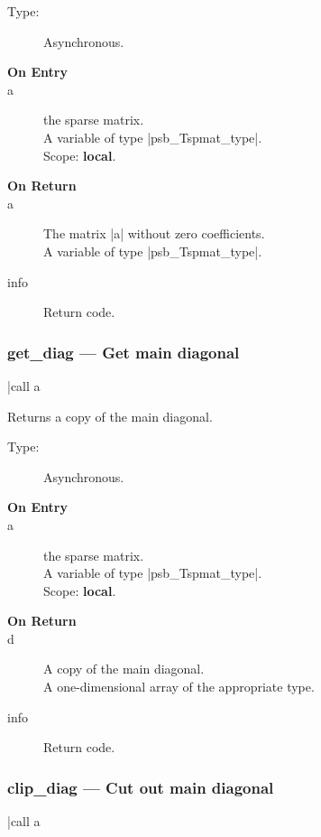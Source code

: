 \begin{description}
\item[Type:] Asynchronous.
\item[\bf On Entry]
\item[a] the sparse matrix.\\
A variable of type \fortinline|psb_Tspmat_type|.\\
Scope: {\bf local}.\\
\end{description}
\begin{description}
\item[\bf On Return]
\item[a] The matrix  \fortinline|a| without zero coefficients.\\
A variable of type \fortinline|psb_Tspmat_type|.
\item[info] Return code. 
\end{description}

\subsubsection{get\_diag --- Get main diagonal}
\fortinline|call a%

Returns a copy of  the main diagonal.
\begin{description}
\item[Type:] Asynchronous.
\item[\bf On Entry]
\item[a] the sparse matrix.\\
A variable of type \fortinline|psb_Tspmat_type|.\\
Scope: {\bf local}.\\
\end{description}
\begin{description}
\item[\bf On Return]
\item[d] A copy  of the main diagonal.\\
A one-dimensional array of the appropriate type.
\item[info] Return code. 
\end{description}


\subsubsection{clip\_diag --- Cut out main diagonal}
\fortinline|call a%

